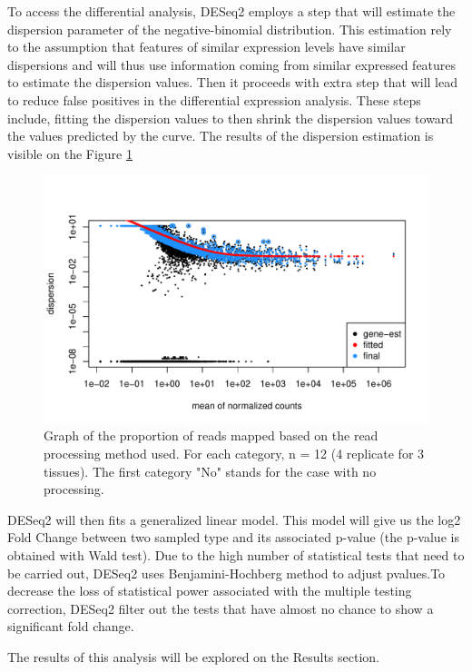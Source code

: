 \documentclass[a4paper, 11pt]{article}
\begin{document}
\begin{multicols}{2}
To access the differential analysis, DESeq2 employs a step that will estimate the dispersion parameter of the negative-binomial distribution. This estimation rely to the assumption that features of similar expression levels have similar dispersions and will thus use information coming from similar expressed features to estimate the dispersion values. Then it proceeds with extra step that will lead to reduce false positives in the differential expression analysis. These steps include, fitting the dispersion values to then shrink the dispersion values toward the values predicted by the curve. The results of the dispersion estimation is visible on the Figure \ref{fig:dispersion}
\begin{figure}[H]
	\centering
	\includegraphics[width=\columnwidth]{Figures/differential_analysis/dispersion.pdf}
	\caption{\footnotesize{Graph of the proportion of reads mapped based on the read processing method used. For each category, n = 12 (4 replicate for 3 tissues). The first category "No" stands for the case with no processing.}}
	\label{fig:dispersion}
\end{figure}

DESeq2 will then fits a generalized linear model. This model will give us the log2 Fold Change between two sampled type and its associated p-value (the p-value is obtained with Wald test). Due to the high number of statistical tests that need to be carried out, DESeq2 uses Benjamini-Hochberg method to adjust pvalues.To decrease the loss of statistical power associated with the multiple testing correction, DESeq2 filter out the tests that have almost no chance to show a significant fold change. 

The results of this analysis will be explored on the Results section.


\end{multicols}
\end{document}
